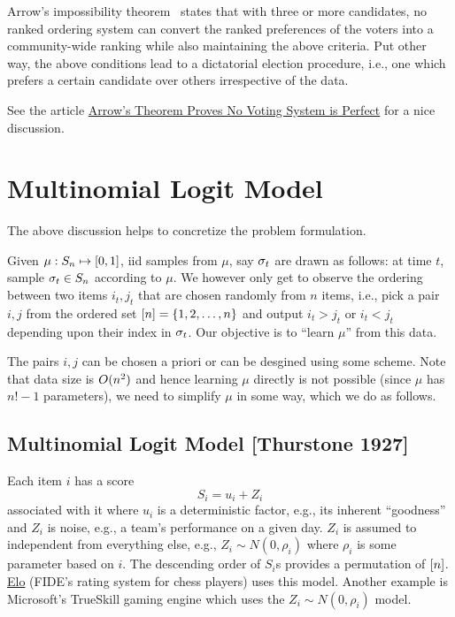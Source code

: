 \documentclass[letterpaper, 11pt, reqno]{amsart}
\begin{document}
Arrow's impossibility theorem~\cite{arrow2012social} states that with three or more candidates, no ranked ordering system can convert the ranked preferences of the voters into a community-wide ranking while also maintaining the above criteria. Put other way, the above conditions lead to a dictatorial election procedure, i.e., one which prefers a certain candidate over others irrespective of the data.

See the article \href{http://tech.mit.edu/V123/N8/8voting.8n.html}{Arrow's Theorem Proves No Voting System is Perfect} for a nice discussion.

\section{Multinomial Logit Model}

The above discussion helps to concretize the problem formulation.

\begin{problem}
Given $\mu: S_n \mapsto [0,1]$, iid samples from $\mu$, say $\sigma_t$ are drawn as follows: at time $t$, sample $\sigma_t \in S_n$ according to $\mu$. We however only get to observe the ordering between two items $i_t, j_t$ that are chosen randomly from $n$ items, i.e., pick a pair $i, j$ from the ordered set $[n] = \{1, 2, \ldots, n\}$ and output $i_t > j_t$ or $i_t < j_t$ depending upon their index in $\sigma_t$. Our objective is to ``learn $\mu$'' from this data.
\end{problem}

The pairs $i, j$ can be chosen a priori or can be desgined using some scheme. Note that data size is $O(n^2)$ and hence learning $\mu$ directly is not possible (since $\mu$ has $n!-1$ parameters), we need to simplify $\mu$ in some way, which we do as follows.

\subsection{Multinomial Logit Model [Thurstone 1927]}

Each item $i$ has a score
$$S_i = u_i + Z_i$$
associated with it where $u_i$ is a deterministic factor, e.g., its inherent ``goodness'' and $Z_i$ is noise, e.g., a team's performance on a given day. $Z_i$ is assumed to independent from everything else, e.g., $Z_i \sim N(0, \rho_i)$ where $\rho_i$ is some parameter based on $i$. The descending order of $S_i$s provides a permutation of $[n]$. \href{http://www.2700chess.com}{Elo} (FIDE's rating system for chess players) uses this model. Another example is Microsoft's TrueSkill gaming engine which uses the $Z_i \sim N(0, \rho_i)$ model.
\end{document}
